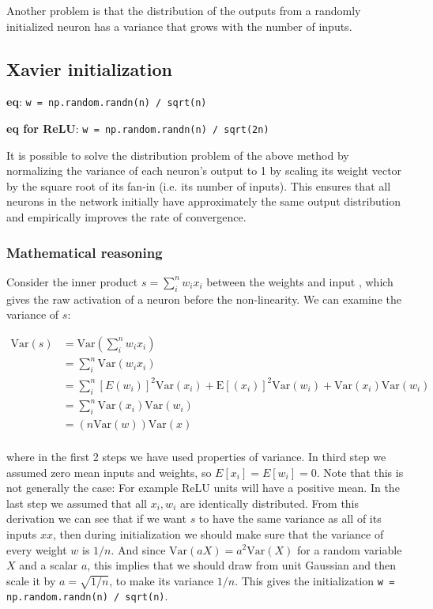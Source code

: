 Another problem is that the distribution of the outputs from a randomly initialized neuron has a variance that grows with the number of inputs.


\subsection*{Xavier initialization}
\textbf{eq}: \texttt{w = np.random.randn(n) / sqrt(n)}

\textbf{eq for ReLU}: \texttt{w = np.random.randn(n) / sqrt(2n)}

It is possible to solve the distribution problem of the above method by normalizing the variance of each neuron’s output to 1 by scaling its weight vector by the square root of its fan-in (i.e. its number of inputs). This ensures that all neurons in the network initially have approximately the same output distribution and empirically improves the rate of convergence.

\subsubsection*{Mathematical reasoning}
Consider the inner product $s=\sum_i^n w_ix_i$ between the weights  and input , which gives the raw activation of a neuron before the non-linearity. We can examine the variance of $s$:

\begin{equation}
\begin{aligned}
\text{Var}(s) &= \text{Var}(\sum_i^n w_ix_i) \\
& =  \sum_i^n \text{Var}(w_ix_i)\\
& = \sum_i^n [E(w_i)]^2\text{Var}(x_i)+\text{E}[(x_i)]^2\text{Var}(w_i)+\text{Var}(x_i)\text{Var}(w_i)\\
& = \sum_i^n \text{Var}(x_i)\text{Var}(w_i)\\
& = (n\text{Var}(w))\text{Var}(x)\\
\end{aligned}
\end{equation}

where in the first 2 steps we have used properties of variance. In third step we assumed zero mean inputs and weights, so $E[x_i] = E[w_i] = 0$. Note that this is not generally the case: For example ReLU units will have a positive mean. In the last step we assumed that all $x_i,w_i$ are identically distributed. From this derivation we can see that if we want $s$ to have the same variance as all of its inputs $xx$, then during initialization we should make sure that the variance of every weight $w$ is $1/n$. And since $\text{Var}(aX) = a^2\text{Var}(X)$ for a random variable $X$ and a scalar $a$, this implies that we should draw from unit Gaussian and then scale it by $a = \sqrt{1/n}$, to make its variance $1/n$. This gives the initialization \texttt{w = np.random.randn(n) / sqrt(n)}.

